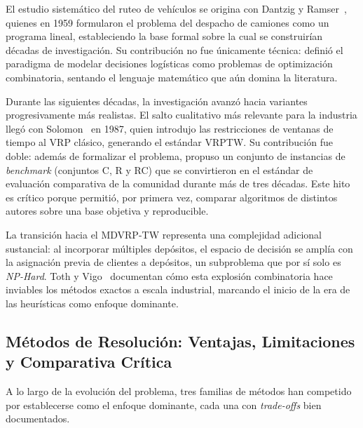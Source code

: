 \documentclass[letter, 10pt]{article}
\begin{document}
El estudio sistem\'atico del ruteo de veh\'iculos se origina con Dantzig y Ramser~\cite{1959truck}, quienes en 1959 formularon el problema del despacho de camiones como un programa lineal, estableciendo la base formal sobre la cual se construir\'ian d\'ecadas de investigaci\'on. Su contribuci\'on no fue \'unicamente t\'ecnica: defini\'o el paradigma de modelar decisiones log\'isticas como problemas de optimizaci\'on combinatoria, sentando el lenguaje matem\'atico que a\'un domina la literatura.

Durante las siguientes d\'ecadas, la investigaci\'on avanz\'o hacia variantes progresivamente m\'as realistas. El salto cualitativo m\'as relevante para la industria lleg\'o con Solomon~\cite{solomon1987algorithms} en 1987, quien introdujo las restricciones de ventanas de tiempo al VRP cl\'asico, generando el est\'andar VRPTW. Su contribuci\'on fue doble: adem\'as de formalizar el problema, propuso un conjunto de instancias de \textit{benchmark} (conjuntos C, R y RC) que se convirtieron en el est\'andar de evaluaci\'on comparativa de la comunidad durante m\'as de tres d\'ecadas. Este hito es cr\'itico porque permiti\'o, por primera vez, comparar algoritmos de distintos autores sobre una base objetiva y reproducible.

La transici\'on hacia el MDVRP-TW representa una complejidad adicional sustancial: al incorporar m\'ultiples dep\'ositos, el espacio de decisi\'on se ampl\'ia con la asignaci\'on previa de clientes a dep\'ositos, un subproblema que por s\'i solo es \textit{NP-Hard}. Toth y Vigo~\cite{toth2002bra} documentan c\'omo esta explosi\'on combinatoria hace inviables los m\'etodos exactos a escala industrial, marcando el inicio de la era de las heur\'isticas como enfoque dominante.

\subsection{M\'etodos de Resoluci\'on: Ventajas, Limitaciones y Comparativa Cr\'itica}

A lo largo de la evoluci\'on del problema, tres familias de m\'etodos han competido por establecerse como el enfoque dominante, cada una con \textit{trade-offs} bien documentados.
\end{document}
